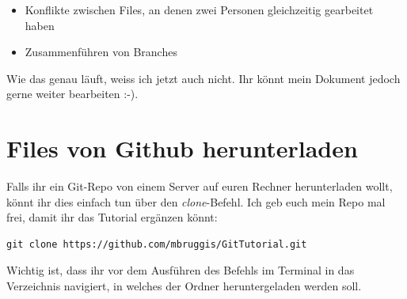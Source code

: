 \documentclass[twoside, 11pr]{article}
\begin{document}
\begin{itemize}
  \item Konflikte zwischen Files, an denen zwei Personen gleichzeitig gearbeitet haben
  \item Zusammenführen von Branches
\end{itemize}

Wie das genau läuft, weiss ich jetzt auch nicht. Ihr könnt mein Dokument jedoch gerne weiter bearbeiten :-).

\section{Files von Github herunterladen}

Falls ihr ein Git-Repo von einem Server auf euren Rechner herunterladen wollt, könnt ihr dies einfach tun über den \textit{clone}-Befehl. Ich geb euch mein Repo mal frei, damit ihr das Tutorial ergänzen könnt:

\begin{lstlisting}
git clone https://github.com/mbruggis/GitTutorial.git
\end{lstlisting}

Wichtig ist, dass ihr vor dem Ausführen des Befehls im Terminal in das Verzeichnis navigiert, in welches der Ordner heruntergeladen werden soll.





%
%




\end{document}
